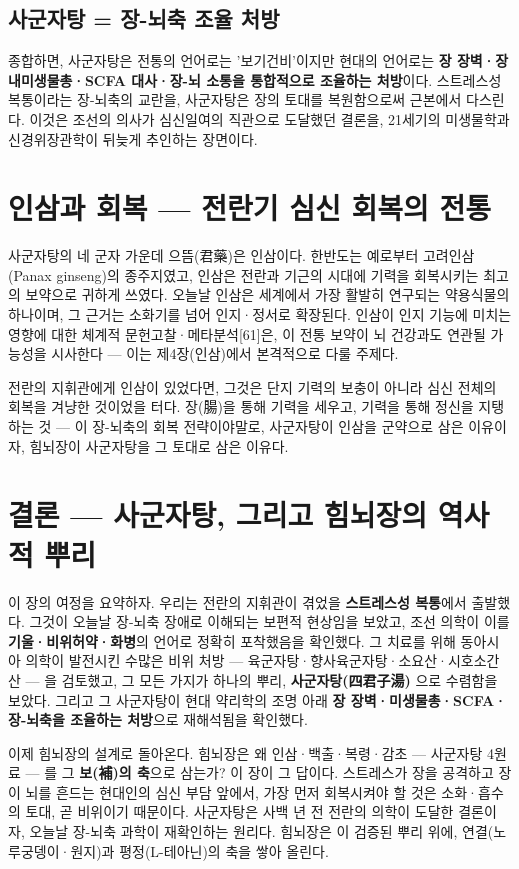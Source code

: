 \documentclass[11pt,oneside]{book}
\begin{document}
\subsection{사군자탕 = 장-뇌축 조율 처방}
종합하면, 사군자탕은 전통의 언어로는 '보기건비'이지만 현대의 언어로는 \textbf{장 장벽·장내미생물총·SCFA 대사·장-뇌 소통을 통합적으로 조율하는 처방}이다. 스트레스성 복통이라는 장-뇌축의 교란을, 사군자탕은 장의 토대를 복원함으로써 근본에서 다스린다. 이것은 조선의 의사가 심신일여의 직관으로 도달했던 결론을, 21세기의 미생물학과 신경위장관학이 뒤늦게 추인하는 장면이다.

\section{인삼과 회복 — 전란기 심신 회복의 전통}
사군자탕의 네 군자 가운데 으뜸(君藥)은 인삼이다. 한반도는 예로부터 고려인삼(Panax ginseng)의 종주지였고, 인삼은 전란과 기근의 시대에 기력을 회복시키는 최고의 보약으로 귀하게 쓰였다. 오늘날 인삼은 세계에서 가장 활발히 연구되는 약용식물의 하나이며, 그 근거는 소화기를 넘어 인지·정서로 확장된다. 인삼이 인지 기능에 미치는 영향에 대한 체계적 문헌고찰·메타분석[61]은, 이 전통 보약이 뇌 건강과도 연관될 가능성을 시사한다 — 이는 제4장(인삼)에서 본격적으로 다룰 주제다.

전란의 지휘관에게 인삼이 있었다면, 그것은 단지 기력의 보충이 아니라 심신 전체의 회복을 겨냥한 것이었을 터다. 장(腸)을 통해 기력을 세우고, 기력을 통해 정신을 지탱하는 것 — 이 장-뇌축의 회복 전략이야말로, 사군자탕이 인삼을 군약으로 삼은 이유이자, 힘뇌장이 사군자탕을 그 토대로 삼은 이유다.

\section{결론 — 사군자탕, 그리고 힘뇌장의 역사적 뿌리}
이 장의 여정을 요약하자. 우리는 전란의 지휘관이 겪었을 \textbf{스트레스성 복통}에서 출발했다. 그것이 오늘날 장-뇌축 장애로 이해되는 보편적 현상임을 보았고, 조선 의학이 이를 \textbf{기울·비위허약·화병}의 언어로 정확히 포착했음을 확인했다. 그 치료를 위해 동아시아 의학이 발전시킨 수많은 비위 처방 — 육군자탕·향사육군자탕·소요산·시호소간산 — 을 검토했고, 그 모든 가지가 하나의 뿌리, \textbf{사군자탕(四君子湯)} 으로 수렴함을 보았다. 그리고 그 사군자탕이 현대 약리학의 조명 아래 \textbf{장 장벽·미생물총·SCFA·장-뇌축을 조율하는 처방}으로 재해석됨을 확인했다.

이제 힘뇌장의 설계로 돌아온다. 힘뇌장은 왜 인삼·백출·복령·감초 — 사군자탕 4원료 — 를 그 \textbf{보(補)의 축}으로 삼는가? 이 장이 그 답이다. 스트레스가 장을 공격하고 장이 뇌를 흔드는 현대인의 심신 부담 앞에서, 가장 먼저 회복시켜야 할 것은 소화·흡수의 토대, 곧 비위이기 때문이다. 사군자탕은 사백 년 전 전란의 의학이 도달한 결론이자, 오늘날 장-뇌축 과학이 재확인하는 원리다. 힘뇌장은 이 검증된 뿌리 위에, 연결(노루궁뎅이·원지)과 평정(L-테아닌)의 축을 쌓아 올린다.
\end{document}
